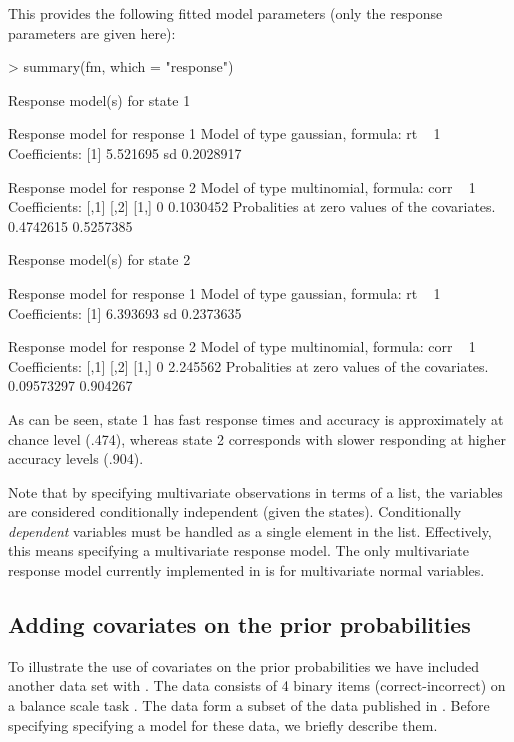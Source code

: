 \documentclass[article]{jss}
\begin{document}
This provides the following fitted model parameters (only the 
response parameters are given here): 
\begin{Schunk}
\begin{Sinput}
> summary(fm, which = "response")
\end{Sinput}
\begin{Soutput}
Response model(s) for state 1 

Response model for response 1 
Model of type gaussian, formula: rt ~ 1
Coefficients: 
[1] 5.521695
sd  0.2028917 

Response model for response 2 
Model of type multinomial, formula: corr ~ 1
Coefficients: 
     [,1]      [,2]
[1,]    0 0.1030452
Probalities at zero values of the covariates.
0.4742615 0.5257385 


Response model(s) for state 2 

Response model for response 1 
Model of type gaussian, formula: rt ~ 1
Coefficients: 
[1] 6.393693
sd  0.2373635 

Response model for response 2 
Model of type multinomial, formula: corr ~ 1
Coefficients: 
     [,1]     [,2]
[1,]    0 2.245562
Probalities at zero values of the covariates.
0.09573297 0.904267 
\end{Soutput}
\end{Schunk}

As can be seen, state 1 has fast response times and accuracy is
approximately at chance level (.474), whereas state 2 corresponds with
slower responding at higher accuracy levels (.904).

Note that by specifying multivariate observations in terms of a list,
the variables are considered conditionally independent (given the
states).  Conditionally \emph{dependent} variables must be handled as
a single element in the list.  Effectively, this means specifying a
multivariate response model.  The only multivariate response model
currently implemented in  is for multivariate normal
variables.

\subsection{Adding covariates on the prior probabilities}

To illustrate the use of covariates on the prior probabilities we have
included another data set with .  The 
data consists of 4 binary items (correct-incorrect) on a balance scale
task \citep{Siegler1981}.  The data form a subset of the data
published in \citet{Jansen2002}. Before specifying specifying a model 
for these data, we briefly describe them. 
\end{document}
